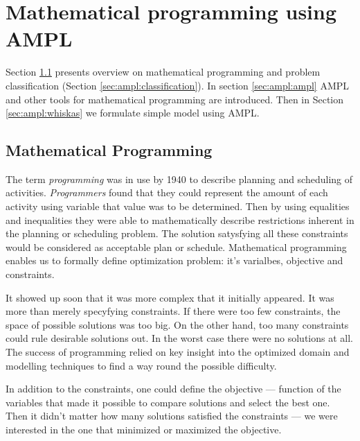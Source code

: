 \chapter{Mathematical programming using AMPL}
\label{chap:ampl} 

Section \ref{sec:ampl:mathprog} presents overview on mathematical programming and problem classification (Section \ref{sec:ampl:classification}). In section \ref{sec:ampl:ampl} AMPL and other tools for mathematical programming are introduced. Then in Section \ref{sec:ampl:whiskas} we formulate simple model using AMPL.

\section{Mathematical Programming}
\label{sec:ampl:mathprog}


The term \emph{programming} was in use by 1940 to describe planning and scheduling of activities. \emph{Programmers} found that they could represent the amount of each activity using variable that value was to be determined. Then by using equalities and inequalities they were able to mathematically describe restrictions inherent in the planning or scheduling problem. The solution satysfying all these constraints would be considered as acceptable plan or schedule. Mathematical programming enables us to formally define optimization problem: it's varialbes, objective and constraints.

It showed up soon that it was more complex that it initially appeared. It was more than merely specyfying constraints. If there were too few constraints, the space of possible solutions was too big. On the other hand, too many constraints could rule desirable solutions out. In the worst case there were no solutions at all. The success of programming relied on key insight into the optimized domain and modelling techniques to find a way round the possible difficulty. 

In addition to the constraints, one could define the objective --- function of the variables that made it possible to compare solutions and select the best one. Then it didn't matter how many solutions satisfied the constraints --- we were interested in the one that minimized or maximized the objective.

